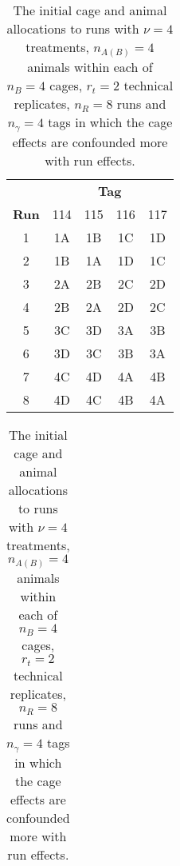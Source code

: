 \begin{table}[ht]                                       
\centering   
\itshape                                        
\caption{The initial cage and animal allocations to runs with $\nu = 4$ treatments, $n_{A(B)} = 4$ animals within each of $n_B = 4$ cages, $r_t = 2$ technical replicates, $n_R = 8$ runs and $n_\gamma = 4$ tags in which the cage effects are confounded more with run effects.}           
\begin{tabular}[t]{c|cccc}                                 
	& \multicolumn{4}{c}{{\bf Tag}} \\                     
{\bf Run}  & \textnormal{114} & \textnormal{115} & \textnormal{116} & \textnormal{117} \\ 
\hline                                                   
	\textnormal{1}  & 1A & 1B & 1C & 1D \\ 
	\textnormal{2}  & 1B & 1A & 1D & 1C \\ 
	\textnormal{3}  & 2A & 2B & 2C & 2D \\ 
	\textnormal{4}  & 2B & 2A & 2D & 2C \\ 
	\textnormal{5}  & 3C & 3D & 3A & 3B \\ 
	\textnormal{6}  & 3D & 3C & 3B & 3A \\ 
	\textnormal{7}  & 4C & 4D & 4A & 4B \\ 
	\textnormal{8}  & 4D & 4C & 4B & 4A \\         
\end{tabular}                                           
\label{tab:cagAniDes11}                                  

\begin{tabular}{l}
	\\	
\end{tabular} 
                                         

\end{table}
